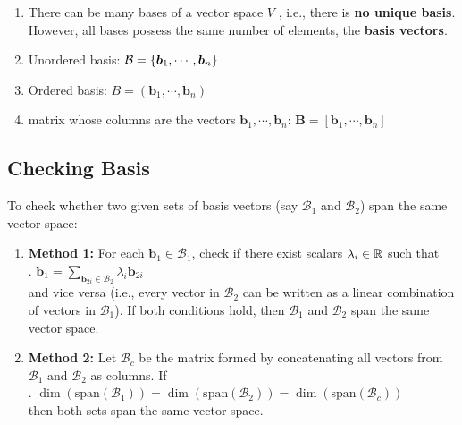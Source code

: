\begin{enumerate}
    \item There can be many bases of a vector space $V$ , i.e., there is \textbf{no unique basis}. 
    However, all bases possess the same number of elements, the \textbf{basis vectors}. 
    \hfill \cite{mfml/book/mml/Deisenroth-Faisal-Ong}

    \item Unordered basis: $\mathcal{B} = \left\{\bm{b}_1, \cdots, \bm{b}_n\right\}$
    \hfill \cite{mfml/book/mml/Deisenroth-Faisal-Ong}

    \item Ordered basis: $B = (\bm{b}_1, \cdots, \bm{b}_n)$
    \hfill \cite{mfml/book/mml/Deisenroth-Faisal-Ong}

    \item matrix whose columns are the vectors $\bm{b}_1, \cdots, \bm{b}_n$: $\bm{B} = [\bm{b}_1, \cdots, \bm{b}_n]$
    \hfill \cite{mfml/book/mml/Deisenroth-Faisal-Ong}
\end{enumerate}


\subsection{Checking Basis}

To check whether two given sets of basis vectors (say $\mathcal{B}_1$ and $\mathcal{B}_2$) span the same vector space: 
\hfill \cite{common/online/chatgpt}
\begin{enumerate}
    \item \textbf{Method 1:} For each $\mathbf{b}_1 \in \mathcal{B}_1$, check if there exist scalars $\lambda_i \in \mathbb{R}$ such that
    \hfill \cite{common/online/chatgpt}
    \\
    .\hfill
    $
        \mathbf{b}_1 = \sum_{\mathbf{b}_{2i} \in \mathcal{B}_2} \lambda_i \mathbf{b}_{2i}
    $ 
    \hfill \cite{common/online/chatgpt}
    \\
    and vice versa (i.e., every vector in $\mathcal{B}_2$ can be written as a linear combination of vectors in $\mathcal{B}_1$).  
    If both conditions hold, then $\mathcal{B}_1$ and $\mathcal{B}_2$ span the same vector space.
    \hfill \cite{common/online/chatgpt}

    \item \textbf{Method 2:} Let $\mathcal{B}_c$ be the matrix formed by concatenating all vectors from $\mathcal{B}_1$ and $\mathcal{B}_2$ as columns.  
    If 
    \hfill \cite{common/online/chatgpt}
    \\
    .\hfill
    $
        \dim(\mathrm{span}(\mathcal{B}_1)) = \dim(\mathrm{span}(\mathcal{B}_2)) = \dim(\mathrm{span}(\mathcal{B}_c))
    $
    \hfill \cite{common/online/chatgpt}
    \\
    then both sets span the same vector space.
    \hfill \cite{common/online/chatgpt}
\end{enumerate}


